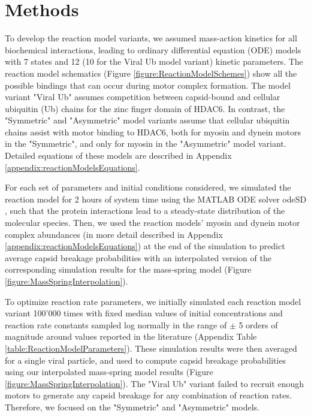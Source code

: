 \section{Methods}
\label{ch:ReactionModelsMethods}

To develop the reaction model variants, we assumed mass-action kinetics for all biochemical interactions, leading to ordinary differential equation (ODE) models with 7 states and 12 (10 for the Viral Ub model variant) kinetic parameters. The reaction model schematics (Figure \ref{figure:ReactionModelSchemes}) show all the possible bindings that can occur during motor complex formation. The model variant "Viral Ub" assumes competition between capsid-bound and cellular ubiquitin (Ub) chains for the zinc finger domain of HDAC6. In contrast, the "Symmetric" and "Asymmetric" model variants assume that cellular ubiquitin chains assist with motor binding to HDAC6, both for myosin and dynein motors in the "Symmetric", and only for myosin in the "Asymmetric" model variant. Detailed equations of these models are described in Appendix \ref{appendix:reactionModelsEquations}.

For each set of parameters and initial conditions considered, we simulated the reaction model for 2 hours of system time using the MATLAB ODE solver odeSD \cite{gonnet2012specialized}, such that the protein interactions lead to a steady-state distribution of the molecular species. Then, we used the reaction models' myosin and dynein motor complex abundances (in more detail described in Appendix \ref{appendix:reactionModelsEquations}) at the end of the simulation to predict average capsid breakage probabilities with an interpolated version of the corresponding simulation results for the mass-spring model (Figure \ref{figure:MassSpringInterpolation}).

To optimize reaction rate parameters, we initially simulated each reaction model variant 100’000 times with fixed median values of initial concentrations and reaction rate constants sampled log normally in the range of $\pm$ 5 orders of magnitude around values reported in the literature (Appendix Table \ref{table:ReactionModelParameters}). These simulation results were then averaged for a single viral particle, and used to compute capsid breakage probabilities using our interpolated mass-spring model results (Figure \ref{figure:MassSpringInterpolation}). The "Viral Ub" variant failed to recruit enough motors to generate any capsid breakage for any combination of reaction rates. Therefore, we focused on the "Symmetric" and "Asymmetric" models.


